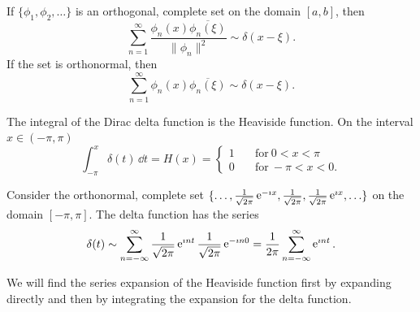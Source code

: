 \begin{Result}
  If $\{\phi_1, \phi_2, \ldots \}$ is an orthogonal, complete set on the 
  domain $[a,b]$, then 
  \[ 
  \sum_{n = 1}^\infty \frac{\phi_n(x) \overline{\phi_n(\xi)}}{\|\phi_n\|^2} 
  \sim \delta(x-\xi).
  \]
  If the set is orthonormal, then
  \[ 
  \sum_{n = 1}^\infty \phi_n(x) \overline{\phi_n(\xi)} \sim \delta(x-\xi). 
  \]
\end{Result}






\begin{Example}
  The integral of the Dirac delta function is the Heaviside function.  On the
  interval $x \in (-\pi, \pi)$
  \[\int_{-\pi}^x \delta(t)\,\dd t = H(x) = 
  \begin{cases}
    1 \quad &\mathrm{for}\ 0 < x < \pi \\
    0 \quad &\mathrm{for}\ -\pi < x < 0.
  \end{cases}
  \]

  Consider the orthonormal, complete set $\{\ldots, \frac{1}{\sqrt{2\pi}}
  \mathop{\mathrm{e}}\nolimits^{-\imath x}, \frac{1}{\sqrt{2\pi}}, \frac{1}{\sqrt{2\pi}}\mathop{\mathrm{e}}\nolimits^{\imath x}, \ldots \}$ 
  on the domain $[-\pi,\pi]$.  The delta function has the series
  \[ \delta(t) \sim \sum_{n = -\infty}^\infty \frac{1}{\sqrt{2\pi}} \mathop{\mathrm{e}}\nolimits^{\imath n t} 
  \frac{1}{\sqrt{2\pi}} \mathop{\mathrm{e}}\nolimits^{-\imath n 0}
  = \frac{1}{2\pi} \sum_{n = -\infty}^\infty \mathop{\mathrm{e}}\nolimits^{\imath n t}. \]

  We will find the series expansion of the Heaviside function
  first by expanding directly and then by integrating the expansion for
  the delta function.







\end{Example}
